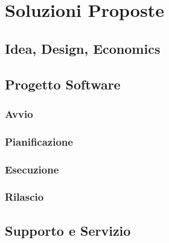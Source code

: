 \section{Soluzioni Proposte}

    \subsection{Idea, Design, Economics}

    \subsection{Progetto Software}
        \subsubsection{Avvio}
        \subsubsection{Pianificazione}
        \subsubsection{Esecuzione}
        \subsubsection{Rilascio}

    \subsection{Supporto e Servizio}
